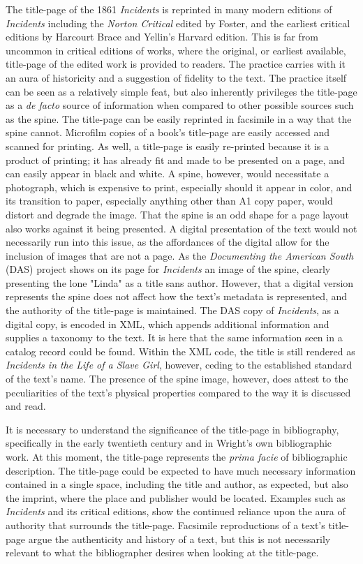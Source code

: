 The title-page of the 1861 \textit{Incidents} is reprinted in many modern editions of \textit{Incidents} including the \textit{Norton Critical} edited by Foster, and the earliest critical editions by Harcourt Brace and Yellin's Harvard edition. This is far from uncommon in critical editions of works, where the original, or earliest available, title-page of the edited work is provided to readers. The practice carries with it an aura of historicity and a suggestion of fidelity to the text. The practice itself can be seen as a relatively simple feat, but also inherently privileges the title-page as a \textit{de facto} source of information when compared to other possible sources such as the spine. The title-page can be easily reprinted in facsimile in a way that the spine cannot. Microfilm copies of a book's title-page are easily accessed and scanned for printing. As well, a title-page is easily re-printed because it is a product of printing; it has already fit and made to be presented on a page, and can easily appear in black and white. A spine, however, would necessitate a photograph, which is expensive to print, especially should it appear in color, and its transition to paper, especially anything other than A1 copy paper, would distort and degrade the image. That the spine is an odd shape for a page layout also works against it being presented. A digital presentation of the text would not necessarily run into this issue, as the affordances of the digital allow for the inclusion of images that are not a page. As the \textit{Documenting the American South} (DAS) project shows on its page for \textit{Incidents} an image of the spine, clearly presenting the lone "Linda" as a title sans author.\autocite{noauthor_harriet_nodate} However, that a digital version represents the spine does not affect how the text's metadata is represented, and the authority of the title-page is maintained. The DAS copy of \textit{Incidents}, as a digital copy, is encoded in XML, which appends additional information and supplies a taxonomy to the text. It is here that the same information seen in a catalog record could be found. Within the XML code, the title is still rendered as \textit{Incidents in the Life of a Slave Girl}, however, ceding to the established standard of the text's name. The presence of the spine image, however, does attest to the peculiarities of the text's physical properties compared to the way it is discussed and read.

It is necessary to understand the significance of the title-page in bibliography, specifically in the early twentieth century and in Wright's own bibliographic work. At this moment, the title-page represents the \textit{prima facie} of bibliographic description. The title-page could be expected to have much necessary information contained in a single space, including the title and author, as expected, but also the imprint, where the place and publisher would be located. Examples such as \textit{Incidents} and its critical editions, show the continued reliance upon the aura of authority that surrounds the title-page. Facsimile reproductions of a text's title-page argue the authenticity and history of a text, but this is not necessarily relevant to what the bibliographer desires when looking at the title-page. 

